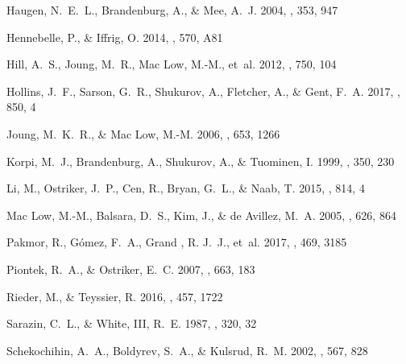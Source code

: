\documentclass[preprint2]{aastex63}
\begin{document}
\begin{thebibliography}{}
{Haugen}, N.~E.~L., {Brandenburg}, A., \& {Mee}, A.~J. 2004{},
 \mnras, 353, 947

{Hennebelle}, P., \& {Iffrig}, O. 2014, \aap, 570, A81

{Hill}, A.~S., {Joung}, M.~R., {Mac Low}, M.-M., {et~al.} 2012, \apj, 750, 104

{Hollins}, J.~F., {Sarson}, G.~R., {Shukurov}, A., {Fletcher}, A., \& {Gent},
 F.~A. 2017, \apj, 850, 4

{Joung}, M.~K.~R., \& {Mac Low}, M.-M. 2006, \apj, 653, 1266

{Korpi}, M.~J., {Brandenburg}, A., {Shukurov}, A., \& {Tuominen}, I. 1999,
 \aap, 350, 230

{Li}, M., {Ostriker}, J.~P., {Cen}, R., {Bryan}, G.~L., \& {Naab}, T. 2015,
 \apj, 814, 4

{Mac Low}, M.-M., {Balsara}, D.~S., {Kim}, J., \& {de Avillez}, M.~A. 2005,
 \apj, 626, 864

{Pakmor}, R., {G{\'o}mez}, F.~A., {Grand }, R. J.~J., {et~al.} 2017, \mnras,
 469, 3185

{Piontek}, R.~A., \& {Ostriker}, E.~C. 2007, \apj, 663, 183

{Rieder}, M., \& {Teyssier}, R. 2016, \mnras, 457, 1722

{Sarazin}, C.~L., \& {White}, III, R.~E. 1987, \apj, 320, 32

{Schekochihin}, A.~A., {Boldyrev}, S.~A., \& {Kulsrud}, R.~M. 2002, \apj, 567,
 828


\end{thebibliography}
\end{document}
